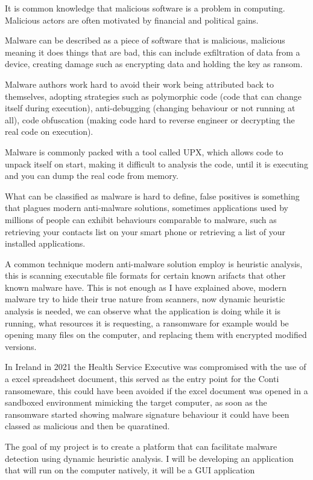 
It is common knowledge that malicious software is a problem in computing.
Malicious actors are often motivated by financial and political gains.

Malware can be described as a piece of software that is malicious,
malicious meaning it does things that are bad,
this can include exfiltration of data from a device,
creating damage such as encrypting data and holding the key as ransom.

Malware authors work hard to avoid their work being attributed back to themselves,
adopting strategies such as polymorphic code (code that can change itself during execution),
anti-debugging (changing behaviour or not running at all),
code obfuscation (making code hard to reverse engineer or decrypting the real code on execution).

Malware is commonly packed with a tool called UPX, which allows code to unpack itself on start,
making it difficult to analysis the code, until it is executing and you can dump the real code from memory.

What can be classified as malware is hard to define, false positives is something that plagues modern anti-malware solutions,
sometimes applications used by millions of people can exhibit behaviours comparable to malware,
such as retrieving your contacts list on your smart phone or retrieving a list of your installed applications.

A common technique modern anti-malware solution employ is heuristic analysis,
this is scanning executable file formats for certain known arifacts that other known malware have.
This is not enough as I have explained above, modern malware try to hide their true nature from scanners,
now dynamic heuristic analysis is needed, we can observe what the application is doing while it is running, what resources it is requesting,
a ransomware for example would be opening many files on the computer, and replacing them with encrypted modified versions.

In Ireland in 2021 the Health Service Executive was compromised with the use of a excel spreadsheet document,
this served as the entry point for the Conti ransomeware, this could have been avoided if the excel document was opened in a sandboxed environment mimicking the target computer,
as soon as the ransomware started showing malware signature behaviour it could have been classed as malicious and then be quaratined.

The goal of my project is to create a platform that can facilitate malware detection using dynamic heuristic analysis.
I will be developing an application that will run on the computer natively, it will be a GUI application

